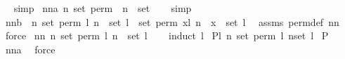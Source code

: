 \begin{isabellebody}
\ %
\endisadelimproof
%
\isatagproof
{}\isamarkupfalse%
\ simp%
\endisatagproof
{\isafoldproof}%
%
\isadelimproof
%
\endisadelimproof
\isanewline
{}\isamarkupfalse%
\ nn{}{}a{\isacharcolon}\ {\isachardoublequoteopen}{\isasymforall}n{\isachardot}\ set\ {\isacharparenleft}perm{}\ {\isacharbrackleft}{\isacharbrackright}\ n{\isacharparenright}\ {\isacharequal}\ set\ {\isacharbrackleft}{\isacharbrackright}{\isachardoublequoteclose}%
\isadelimproof
\ %
\endisadelimproof
%
\isatagproof
{}\isamarkupfalse%
\ simp%
\endisatagproof
{\isafoldproof}%
%
\isadelimproof
%
\endisadelimproof
\isanewline
{}\isamarkupfalse%
\ nn{}{}b{\isacharcolon}\ \ {\isachardoublequoteopen}{\isasymforall}n{\isachardot}\ {\isacharparenleft}set\ {\isacharparenleft}perm{}\ l\ n{\isacharparenright}\ {\isacharequal}\ set\ l{\isacharparenright}{\isachardoublequoteclose}\ \ {\isachardoublequoteopen}set\ {\isacharparenleft}perm{}\ {\isacharparenleft}x{\isacharhash}l{\isacharparenright}\ n{\isacharparenright}\ {\isacharequal}\ {\isacharbraceleft}x{\isacharbraceright}\ {\isasymunion}\ set\ l{\isachardoublequoteclose}\ \isanewline
%
\isadelimproof
%
\endisadelimproof
%
\isatagproof
{}\isamarkupfalse%
\ assms\ perm{}{\isacharunderscore}def\ nn{}{}\ \isamarkupfalse%
\ force%
\endisatagproof
{\isafoldproof}%
%
\isadelimproof
\isanewline
%
\endisadelimproof
{}\isamarkupfalse%
\ nn{}{}{\isacharcolon}\ {\isachardoublequoteopen}{\isasymforall}n{\isachardot}\ set\ {\isacharparenleft}perm{}\ l\ n{\isacharparenright}\ {\isacharequal}\ set\ l{\isachardoublequoteclose}\ \isanewline
%
\isadelimproof
\ \isanewline
%
\endisadelimproof
%
\isatagproof
{}\isamarkupfalse%
\ {\isacharparenleft}induct\ l{\isacharparenright}\isanewline
{}\isamarkupfalse%
\ {\isacharquery}P{\isacharequal}{\isachardoublequoteopen}{\isacharpercent}l{\isachardot}\ {\isacharparenleft}{\isasymforall}n{\isachardot}\ set\ {\isacharparenleft}perm{}\ l\ n{\isacharparenright}{\isacharequal}set\ l{\isacharparenright}{\isachardoublequoteclose}\isanewline
{}\isamarkupfalse%
\ {\isachardoublequoteopen}{\isacharquery}P\ {\isacharbrackleft}{\isacharbrackright}{\isachardoublequoteclose}\ \isamarkupfalse%
\ nn{}{}a\ \isamarkupfalse%
\ force\ \isamarkupfalse%

\end{isabellebody}
